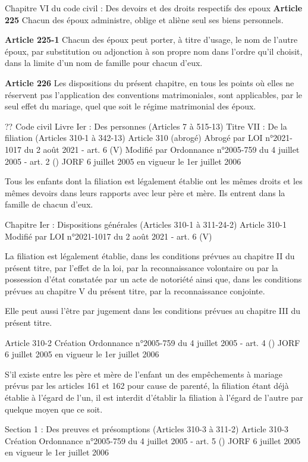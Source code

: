 \documentclass[
  12pt,
]{book}
\begin{document}
\begin{encadre}{Chapitre VI du code civil : Des devoirs et des droits respectifs des epoux}
\textbf{Article 225}
Chacun des époux administre, oblige et aliène seul ses biens personnels.

\textbf{Article 225-1}
Chacun des époux peut porter, à titre d'usage, le nom de l'autre époux, par substitution ou adjonction à son propre nom dans l'ordre qu'il choisit, dans la limite d'un nom de famille pour chacun d'eux.

\textbf{Article 226}
Les dispositions du présent chapitre, en tous les points où elles ne réservent pas l'application des conventions matrimoniales, sont applicables, par le seul effet du mariage, quel que soit le régime matrimonial des époux.

\end{encadre}

\begin{encadre}{??}
Code civil
Livre Ier : Des personnes (Articles 7 à 515-13)
Titre VII : De la filiation (Articles 310-1 à 342-13)
Article 310 (abrogé)
Abrogé par LOI n°2021-1017 du 2 août 2021 - art. 6 (V)
Modifié par Ordonnance n°2005-759 du 4 juillet 2005 - art. 2 () JORF 6 juillet 2005 en vigueur le 1er juillet 2006

Tous les enfants dont la filiation est légalement établie ont les mêmes droits et les mêmes devoirs dans leurs rapports avec leur père et mère. Ils entrent dans la famille de chacun d'eux.

Chapitre Ier : Dispositions générales (Articles 310-1 à 311-24-2)
Article 310-1
Modifié par LOI n°2021-1017 du 2 août 2021 - art. 6 (V)

La filiation est légalement établie, dans les conditions prévues au chapitre II du présent titre, par l'effet de la loi, par la reconnaissance volontaire ou par la possession d'état constatée par un acte de notoriété ainsi que, dans les conditions prévues au chapitre V du présent titre, par la reconnaissance conjointe.

Elle peut aussi l'être par jugement dans les conditions prévues au chapitre III du présent titre.

Article 310-2
Création Ordonnance n°2005-759 du 4 juillet 2005 - art. 4 () JORF 6 juillet 2005 en vigueur le 1er juillet 2006

S'il existe entre les père et mère de l'enfant un des empêchements à mariage prévus par les articles 161 et 162 pour cause de parenté, la filiation étant déjà établie à l'égard de l'un, il est interdit d'établir la filiation à l'égard de l'autre par quelque moyen que ce soit.

Section 1 : Des preuves et présomptions (Articles 310-3 à 311-2)
Article 310-3
Création Ordonnance n°2005-759 du 4 juillet 2005 - art. 5 () JORF 6 juillet 2005 en vigueur le 1er juillet 2006


\end{encadre}
\end{document}
